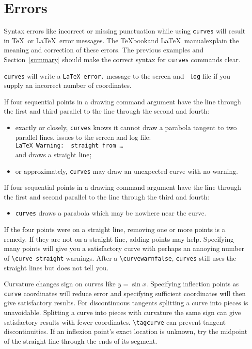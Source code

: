   \section{Errors}
  Syntax errors like incorrect or missing punctuation while using {\tt curves}
will result in \TeX\ or \LaTeX\ error messages. The \TeX book\footnotemark[2]
and \LaTeX\ manual\footnotemark[1] explain the meaning and correction of these
errors. The previous examples and Section~\ref{summary} should make the
correct syntax for {\tt curves} commands clear.

  {\tt curves} will write a {\tt LaTeX error.} message to the screen and {\tt
log} file if you supply an incorrect number of coordinates.

   If four sequential points in a drawing command argument have the line
through the first and third parallel to the line through the second and
fourth:
   \begin{itemize}
  \item exactly or closely, {\tt curves} knows it cannot draw a parabola 
tangent to two parallel lines, issues to the screen and log file:\\ 
  {\tt LaTeX Warning: \string\curve\ straight from \ldots}\\
   and draws a straight line;  
  \item or approximately, {\tt curves} may draw an unexpected curve with no
warning.
   \end{itemize}
      If four sequential points in a drawing command argument have the line
through the first and second parallel to the line through the third and
fourth:
  \begin{itemize}
  \item {\tt curves} draws a parabola which may be nowhere near the curve.
  \end{itemize}
   If the four points were on a straight line, removing one or more points is
a remedy. If they are not on a straight line, adding points may help. 
  Specifying many points will give you a satisfactory curve with perhaps an 
annoying number of \verb?\curve straight? warnings. After a 
\verb?\curvewarnfalse?, {\tt curves} still uses the straight lines but does 
not tell you. 

  Curvature changes sign on curves like \(y=\sin x\). Specifying inflection 
points as {\tt curve} coordinates will reduce error and  specifying sufficient 
coordinates will then give satisfactory results. For discontinuous tangents 
splitting a curve into pieces is unavoidable.  Splitting a curve into pieces 
with curvature the same sign can give satisfactory results with fewer 
coordinates. \verb?\tagcurve? can prevent tangent discontinuities. If an 
inflexion point's exact location is unknown, try the midpoint of the straight
line through the ends of its segment.

